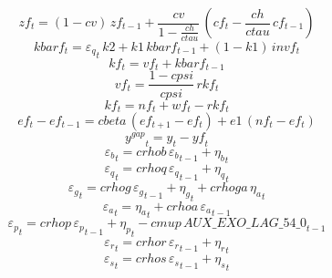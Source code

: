 \begin{dmath}
{zf}_{t}=\left(1-{cv}\right)\, {zf}_{t-1}+\frac{{cv}}{1-\frac{{ch}}{{ctau}}}\, \left({cf}_{t}-\frac{{ch}}{{ctau}}\, {cf}_{t-1}\right)
\end{dmath}
\begin{dmath}
{kbarf}_{t}={{\varepsilon_q}}_{t}\, {k2}+{k1}\, {kbarf}_{t-1}+\left(1-{k1}\right)\, {invf}_{t}
\end{dmath}
\begin{dmath}
{kf}_{t}={vf}_{t}+{kbarf}_{t-1}
\end{dmath}
\begin{dmath}
{vf}_{t}=\frac{1-{cpsi}}{{cpsi}}\, {rkf}_{t}
\end{dmath}
\begin{dmath}
{kf}_{t}={nf}_{t}+{wf}_{t}-{rkf}_{t}
\end{dmath}
\begin{dmath}
{ef}_{t}-{ef}_{t-1}={cbeta}\, \left({ef}_{t+1}-{ef}_{t}\right)+{e1}\, \left({nf}_{t}-{ef}_{t}\right)
\end{dmath}
\begin{dmath}
{{y^{gap}}}_{t}={{y}}_{t}-{yf}_{t}
\end{dmath}
\begin{dmath}
{{\varepsilon_b}}_{t}={crhob}\, {{\varepsilon_b}}_{t-1}+{{\eta_b}}_{t}
\end{dmath}
\begin{dmath}
{{\varepsilon_q}}_{t}={crhoq}\, {{\varepsilon_q}}_{t-1}+{{\eta_q}}_{t}
\end{dmath}
\begin{dmath}
{{\varepsilon_g}}_{t}={crhog}\, {{\varepsilon_g}}_{t-1}+{{\eta_g}}_{t}+{crhoga}\, {{\eta_a}}_{t}
\end{dmath}
\begin{dmath}
{{\varepsilon_a}}_{t}={{\eta_a}}_{t}+{crhoa}\, {{\varepsilon_a}}_{t-1}
\end{dmath}
\begin{dmath}
{{\varepsilon_p}}_{t}={crhop}\, {{\varepsilon_p}}_{t-1}+{{\eta_p}}_{t}-{cmup}\, {AUX\_EXO\_LAG\_54\_0}_{t-1}
\end{dmath}
\begin{dmath}
{{\varepsilon_r}}_{t}={crhor}\, {{\varepsilon_r}}_{t-1}+{{\eta_r}}_{t}
\end{dmath}
\begin{dmath}
{{\varepsilon_s}}_{t}={crhos}\, {{\varepsilon_s}}_{t-1}+{{\eta_s}}_{t}
\end{dmath}
